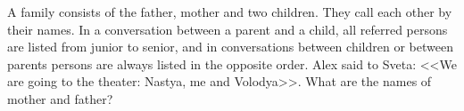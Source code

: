 \problem{}
A family consists of the father, mother and two children.
They call each other by their names.
In a conversation between a parent and a child, all referred persons are listed from junior to senior,
and in conversations between children or between parents persons are always listed in the opposite order.
Alex said to Sveta: <<We are going to the theater: Nastya, me and Volodya>>.
What are the names of mother and father?

\solution

\endproblem
